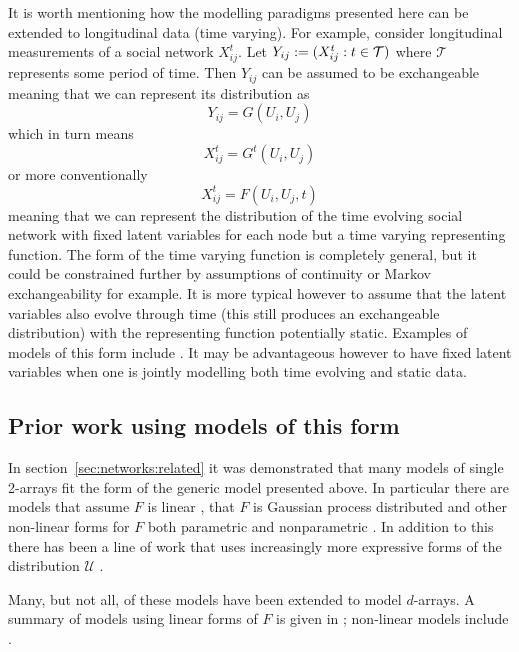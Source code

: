 It is worth mentioning how the modelling paradigms presented here can be extended to longitudinal data (\ie time varying).
For example, consider longitudinal measurements of a social network $X_{ij}^t$.
Let $Y_{ij} := (X_{ij}^t : t \in \mathcal{T})$ where $\mathcal{T}$ represents some period of time.
Then $Y_{ij}$ can be assumed to be exchangeable meaning that we can represent its distribution as
\[
  Y_{ij} = G(U_i, U_j)
\]
which in turn means
\[
  X_{ij}^t = G^t(U_i, U_j)
\]
or more conventionally
\[
  X_{ij}^t = F(U_i, U_j, t)
\]
meaning that we can represent the distribution of the time evolving social network with fixed latent variables for each node but a time varying representing function.
The form of the time varying function is completely general, but it could be constrained further by assumptions of continuity or Markov exchangeability for example.
It is more typical however to assume that the latent variables also evolve through time (this still produces an exchangeable distribution) with the representing function potentially static.
Examples of models of this form include \citep[e.g.][]{Adams2010-ln, durante2014bayesian}.
It may be advantageous however to have fixed latent variables when one is jointly modelling both time evolving and static data.

\subsection{Prior work using models of this form}

In section~\ref{sec:networks:related} it was demonstrated that many models of single 2-arrays fit the form of the generic model presented above.
In particular there are models that assume $F$ is linear \citep[e.g.][]{Hoff2007-ja, Meeds2007-gd, Salakhutdinov2008-zt, Yu2008-tz, Miller2009-wg}, that $F$ is Gaussian process distributed \citep[e.g.][]{Lawrence2009-za, Yan2011-lc, Lloyd2012-sb} and other non-linear forms for $F$ both parametric \citep[e.g.][]{Hoff2002-vy} and nonparametric \citep[e.g.][]{Roy2009-ge}.
In addition to this there has been a line of work that uses increasingly more expressive forms of the distribution $\mathcal{U}$ \citep[e.g.][]{Wang1987-jd, Hoffman_undated-ri, Nowicki2001-xm, Kemp2006-jt, Xu2006-uy, Meeds2007-gd, Miller2009-wg, Palla2012-ch}.

Many, but not all, of these models have been extended to model $d$-arrays.
A summary of models using linear forms of $F$ is given in \cite{Kolda2009-ba}; non-linear models include \cite{Xu2012-ub}.

